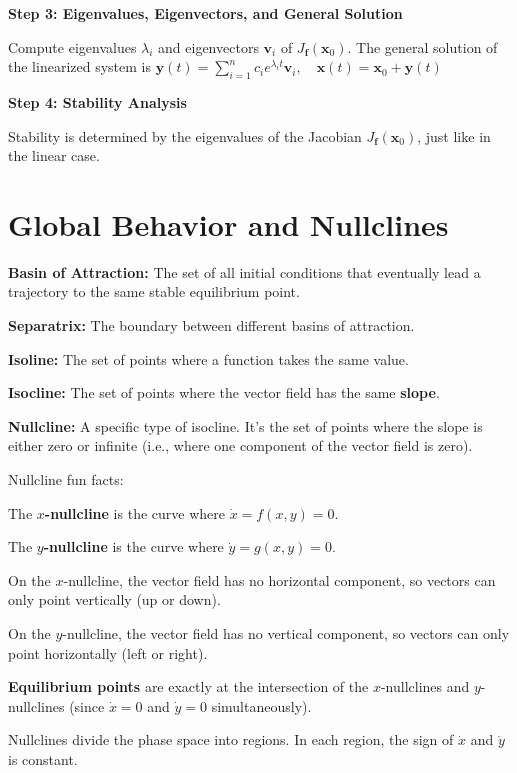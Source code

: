 \textbf{Step 3: Eigenvalues, Eigenvectors, and General Solution}

Compute eigenvalues $\lambda_i$ and eigenvectors $\mathbf{v}_i$ of $J_{\mathbf{f}}(\mathbf{x}_0)$.
The general solution of the linearized system is
$
\mathbf{y}(t) = \sum_{i=1}^n c_i e^{\lambda_i t} \mathbf{v}_i, \quad
\mathbf{x}(t) = \mathbf{x}_0 + \mathbf{y}(t)
$

\textbf{Step 4: Stability Analysis}

Stability is determined by the eigenvalues of the Jacobian $J_{\mathbf{f}}(\mathbf{x}_0)$, just like in the linear case.

\section*{Global Behavior and Nullclines}

\begin{tightitemize}
  \item \textbf{Basin of Attraction:} The set of all initial conditions that eventually lead a trajectory to the same stable equilibrium point.
  \item \textbf{Separatrix:} The boundary between different basins of attraction.
  \item \textbf{Isoline:} The set of points where a function takes the same value.
  \item \textbf{Isocline:} The set of points where the vector field has the same \textbf{slope}.
  \item \textbf{Nullcline:} A specific type of isocline. It's the set of points where the slope is either zero or infinite (i.e., where one component of the vector field is zero).
\end{tightitemize}

Nullcline fun facts:
\begin{tightitemize}
  \item The \textbf{$x$-nullcline} is the curve where $\dot{x} = f(x,y) = 0$.
  \item The \textbf{$y$-nullcline} is the curve where $\dot{y} = g(x,y) = 0$.
  \item On the $x$-nullcline, the vector field has no horizontal component, so vectors can only point vertically (up or down).
  \item On the $y$-nullcline, the vector field has no vertical component, so vectors can only point horizontally (left or right).
  \item \textbf{Equilibrium points} are exactly at the intersection of the $x$-nullclines and $y$-nullclines (since $\dot{x}=0$ and $\dot{y}=0$ simultaneously).
  \item Nullclines divide the phase space into regions. In each region, the sign of $\dot{x}$ and $\dot{y}$ is constant.
\end{tightitemize}

